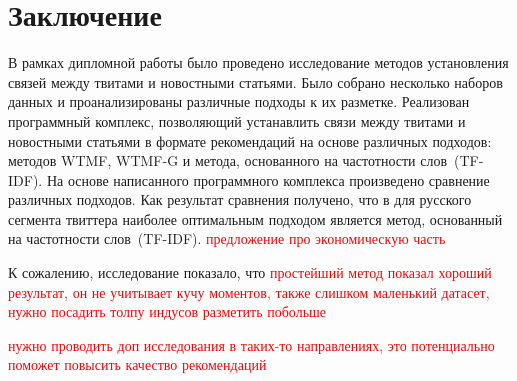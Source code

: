 \section*{Заключение}
    В рамках дипломной работы было проведено исследование методов установления связей между твитами и новостными статьями.
    Было собрано несколько наборов данных и проанализированы различные подходы к их разметке.
    Реализован программный комплекс, позволяющий устанавлить связи между твитами и новостными статьями в формате рекомендаций на основе различных подходов: методов WTMF, WTMF-G и метода, основанного на частотности слов~(TF-IDF).
    На основе написанного программного комплекса произведено сравнение различных подходов. Как результат сравнения получено, что в для русского сегмента твиттера наиболее оптимальным подходом является метод, основанный на частотности слов~(TF-IDF). \textcolor{red}{предложение про экономическую часть}

    К сожалению, исследование показало, что \textcolor{red}{простейший метод показал хороший результат, он не учитывает кучу моментов, также слишком маленький датасет, нужно посадить толпу индусов разметить побольше}

    \textcolor{red}{нужно проводить доп исследования в таких-то направлениях, это потенциально поможет повысить качество рекомендаций}

    
